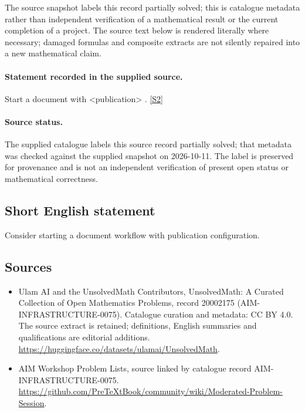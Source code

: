 \documentclass[11pt]{article}
\begin{document}
The source snapshot labels this record partially solved; this is catalogue metadata rather than independent verification of a mathematical result or the current completion of a project.
The source text below is rendered literally where necessary; damaged formulas and composite extracts are not silently repaired into a new mathematical claim.
\paragraph{Statement recorded in the supplied source.}
Start a document with <publication> . \href{https://github.com/PreTeXtBook/community/wiki/Moderated-Problem-Session}{[S2]}
\paragraph{Source status.}
The supplied catalogue labels this source record partially solved; that metadata was checked against the supplied snapshot on 2026-10-11. The label is preserved for provenance and is not an independent verification of present open status or mathematical correctness.
\subsection{Short English statement}
Consider starting a document workflow with publication configuration.
\subsection{Sources}
\begin{itemize}
\item[S1] Ulam AI and the UnsolvedMath Contributors, UnsolvedMath: A Curated Collection of Open Mathematics Problems, record 20002175 (AIM-INFRASTRUCTURE-0075). Catalogue curation and metadata: CC BY 4.0. The source extract is retained; definitions, English summaries and qualifications are editorial additions.
\url{https://huggingface.co/datasets/ulamai/UnsolvedMath}.
\item[S2] AIM Workshop Problem Lists, source linked by catalogue record AIM-INFRASTRUCTURE-0075.
\url{https://github.com/PreTeXtBook/community/wiki/Moderated-Problem-Session}.
\end{itemize}
\end{document}
